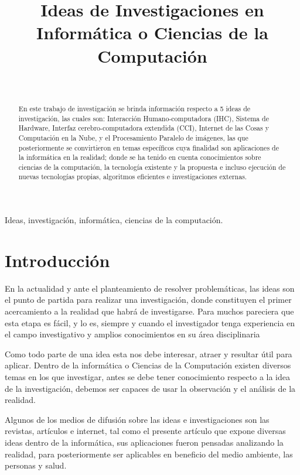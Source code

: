 \documentclass[10pt,journal]{IEEEtran}
\title{Ideas de Investigaciones en Informática o Ciencias de la Computación}
\author{
\IEEEauthorblockN{{\Large Angely Mendez Cruz}} \\
\vspace{2mm}
\IEEEauthorblockA{\textit{Metodología de la Investigación Científica} \\
\textit{Escuela de Informática} \\
\textit{Facultad de Ciencias Físicas y Matemáticas} \\
\textit{Universidad Nacional de Trujillo, \\ Perú }
\\ \vspace{1mm}
t052701020@unitru.edu.pe}}
\begin{document}
\renewcommand{\IEEEkeywordsname}{{\bfseries Palabras claves:}} %

\maketitle

    \begin{abstract}
    En este trabajo de investigación se brinda información respecto a 5 ideas de investigación, las cuales son: Interacción Humano-computadora (IHC), Sistema de Hardware, Interfaz cerebro-computadora extendida (CCI), Internet de las Cosas y Computación en la Nube, y el Procesamiento Paralelo de imágenes, las que posteriormente se convirtieron en temas específicos cuya finalidad son aplicaciones de la informática en la realidad; donde se ha tenido en cuenta conocimientos sobre ciencias de la computación, la tecnología existente y la propuesta e incluso ejecución de nuevas tecnologías propias, algoritmos eficientes e investigaciones externas.
    \end{abstract}
    
    \begin{IEEEkeywords}
    Ideas, investigación, informática, ciencias de la computación.
    \end{IEEEkeywords}
    
    \section{\textbf{Introducción}}
    
    En la actualidad y ante el planteamiento de resolver problemáticas, las ideas son el punto de partida para realizar una investigación, donde constituyen el primer acercamiento a la realidad que habrá de investigarse. Para muchos pareciera que esta etapa es fácil, y lo es, siempre y cuando el investigador tenga experiencia en el campo investigativo y amplios conocimientos en su área disciplinaria
    
    Como todo parte de una idea esta nos debe interesar, atraer y resultar útil para aplicar. Dentro de la informática o Ciencias de la Computación existen diversos temas en los que investigar, antes se debe tener conocimiento respecto a la idea de la investigación, debemos ser capaces de usar la observación y el análisis de la realidad.

    Algunos de los medios de difusión sobre las ideas e investigaciones son las revistas, artículos e internet, tal como el presente artículo que expone diversas ideas dentro de la informática, sus aplicaciones fueron pensadas analizando la realidad, para posteriormente ser aplicables en beneficio del medio ambiente, las personas y salud. 
\end{document}
